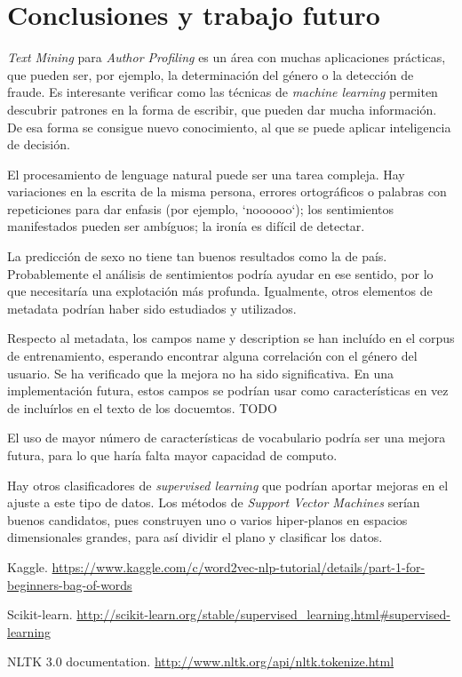 \documentclass[11pt,a4paper]{article}
\begin{document}
\section{Conclusiones y trabajo futuro}
  
  {\em Text Mining} para {\em Author Profiling} es un \'area con muchas aplicaciones pr\'acticas, que pueden ser, por ejemplo, la determinaci\'on del g\'enero o la detecci\'on de fraude. Es interesante verificar como las t\'ecnicas de {\em machine learning} permiten descubrir patrones en la forma de escribir, que pueden dar mucha informaci\'on. De esa forma se consigue nuevo conocimiento, al que se puede aplicar inteligencia de decisi\'on.

  El procesamiento de lenguage natural puede ser una tarea compleja. Hay variaciones en la escrita de la misma persona, errores ortogr\'aficos o palabras con repeticiones para dar enfasis (por ejemplo, `noooooo`); los sentimientos manifestados pueden ser amb\'iguos; la iron\'ia es dif\'icil de detectar. 

  La predicci\'on de sexo no tiene tan buenos resultados como la de pa\'is. Probablemente el an\'alisis de sentimientos podr\'ia ayudar en ese sentido, por lo que necesitar\'ia una explotaci\'on m\'as profunda. Igualmente, otros elementos de metadata podr\'ian haber sido estudiados y utilizados. 

  Respecto al metadata, los campos {\ttfamily name} y {\ttfamily description} se han inclu\'ido en el corpus de entrenamiento, esperando encontrar alguna correlaci\'on con el g\'enero del usuario. Se ha verificado que la mejora no ha sido significativa. En una implementaci\'on futura, estos campos se podr\'ian usar como caracter\'isticas en vez de inclu\'irlos en el texto de los docuemtos. TODO

  El uso de mayor n\'umero de caracter\'isticas de vocabulario podr\'ia ser una mejora futura, para lo que har\'ia falta mayor capacidad de computo.

  Hay otros clasificadores de {\em supervised learning} que podr\'ian aportar mejoras en el ajuste a este tipo de datos. Los m\'etodos de {\em Support Vector Machines} ser\'ian buenos candidatos, pues construyen uno o varios hiper-planos en espacios dimensionales grandes, para as\'i dividir el plano y clasificar los datos. 

\begin{thebibliography}{}

\bibitem{} Kaggle.
\newblock \url{https://www.kaggle.com/c/word2vec-nlp-tutorial/details/part-1-for-beginners-bag-of-words}

\bibitem{} Scikit-learn.
\newblock \url{http://scikit-learn.org/stable/supervised_learning.html#supervised-learning}

\bibitem{} NLTK 3.0 documentation.
\newblock \url{http://www.nltk.org/api/nltk.tokenize.html}


\end{thebibliography}
\end{document}
